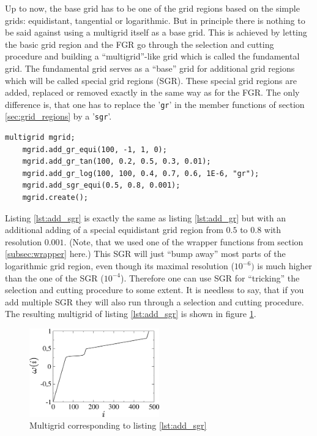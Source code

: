 Up to now, the base grid has to be one of the grid regions based on the simple grids: equidistant, tangential or logarithmic. But in principle there is nothing to be said against using a multigrid itself as a base grid. This is achieved by letting the basic grid region and the FGR go through the selection and cutting procedure and building a ``multigrid''-like grid which is called the fundamental grid. The fundamental grid serves as a ``base'' grid for additional grid regions which will be called special grid regions (SGR). These special grid regions are added, replaced or removed exactly in the same way as for the FGR. The only difference is, that one has to replace the '\texttt{gr}' in the member functions of section \ref{sec:grid_regions} by a '\texttt{sgr}'.
\begin{lstlisting}[caption={Example for adding special grid regions},label={lst:add_sgr}]
	multigrid mgrid;
	mgrid.add_gr_equi(100, -1, 1, 0);
	mgrid.add_gr_tan(100, 0.2, 0.5, 0.3, 0.01);
	mgrid.add_gr_log(100, 100, 0.4, 0.7, 0.6, 1E-6, "gr");
	mgrid.add_sgr_equi(0.5, 0.8, 0.001);
	mgrid.create();
\end{lstlisting}
Listing \ref{lst:add_sgr} is exactly the same as listing \ref{lst:add_gr} but with an additional adding of a special equidistant grid region from $0.5$ to $0.8$ with resolution $0.001$. (Note, that we used one of the wrapper functions from section \ref{subsec:wrapper} here.) This SGR will just ``bump away'' most parts of the logarithmic grid region, even though its maximal resolution ($10^{-6})$ is much higher than the one of the SGR ($10^{-4}$). Therefore one can use SGR for ``tricking'' the selection and cutting procedure to some extent. It is needless to say, that if you add multiple SGR they will also run through a selection and cutting procedure. The resulting multigrid of listing \ref{lst:add_sgr} is shown in figure \ref{fig:example_add_sgr}.
\begin{figure}[h]
	\centering
	\includegraphics[width=0.5\textwidth]{pics/example_add_sgr.eps}
	\caption{Multigrid corresponding to listing \ref{lst:add_sgr}}
	\label{fig:example_add_sgr}
\end{figure}

